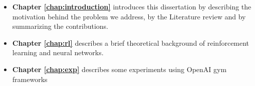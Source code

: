 \begin{itemize}
    \item \textbf{Chapter \ref{chap:introduction}} introduces this dissertation by describing the motivation 
    behind the problem we address, by the Literature review and by summarizing the contributions.

    \item \textbf{Chapter \ref{chap:rl}} describes a brief theoretical background of reinforcement learning and neural networks.
    
    \item \textbf{Chapter \ref{chap:exp}} describes some experiments using OpenAI gym frameworks






\end{itemize}
